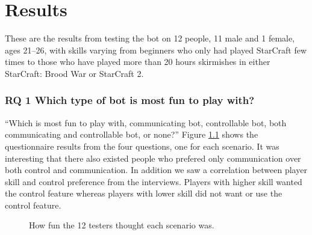 \chapter{Results}
These are the results from testing the bot on 12 people, 11 male and 1 female, ages 21–26, with skills varying from beginners who only had played StarCraft few times to those who have played more than 20 hours skirmishes in either StarCraft: Brood War or StarCraft 2.

\subsection{RQ 1 Which type of bot is most fun to play with?}
``Which is most fun to play with, communicating bot, controllable bot, both communicating and controllable bot, or none?''
Figure \ref{fig:results_fun} shows the questionnaire results from the four questions, one for each scenario. It was interesting that there also existed people who prefered only communication over both control and communication. In addition we saw a correlation between player skill and control preference from the interviews. Players with higher skill wanted the control feature whereas players with lower skill did not want or use the control feature.

\begin{figure}[htb]
\caption{How fun the 12 testers thought each scenario was.}
\label{fig:results_fun}
\end{figure}

